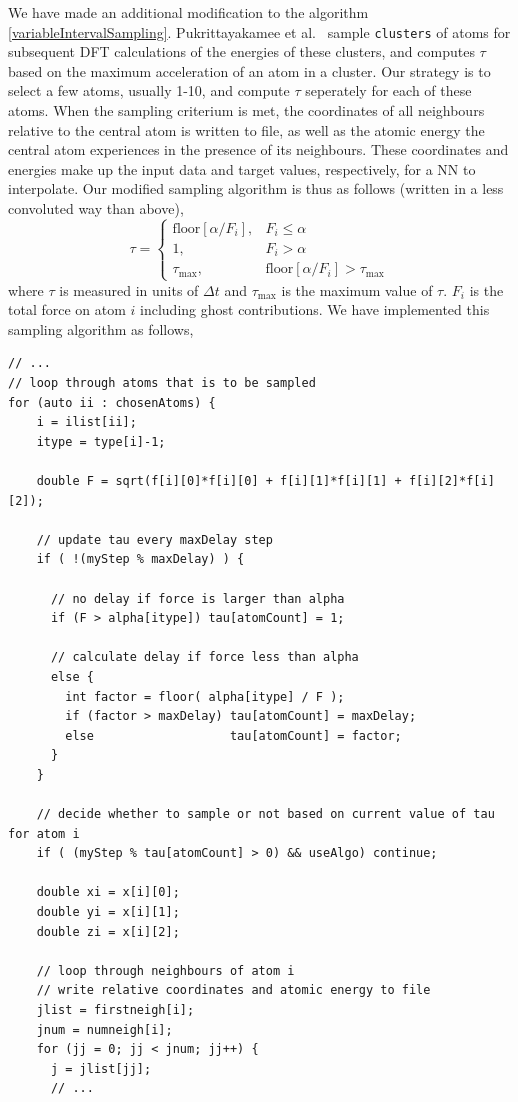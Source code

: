 \documentclass[twoside,english]{uiofysmaster}
\begin{document}
We have made an additional modification to the algorithm \eqref{variableIntervalSampling}.  
Pukrittayakamee et al.\ \cite{Pukrittayakamee09} sample \texttt{clusters} of atoms for subsequent DFT calculations
of the energies of these clusters, and computes $\tau$ based on the maximum acceleration of an atom in a cluster. 
Our strategy is to select a few atoms, usually 1-10, and compute $\tau$ seperately for each of these atoms. When 
the sampling criterium is met, the coordinates of all neighbours relative to the central atom is written to file, 
as well as the atomic energy the central atom experiences in the presence of its neighbours. These coordinates
and energies make up the input data and target values, respectively, for a NN to interpolate. 
Our modified sampling algorithm is thus as follows (written in a less convoluted way than above),
\begin{equation}
 \tau = 
\begin{cases}
  \textrm{floor}\left[\alpha/F_i\right], &F_i \leq \alpha \\
  1, &F_i > \alpha \\
  \tau_\textrm{max}, &\textrm{floor}\left[\alpha/F_i\right] > \tau_\textrm{max}
\end{cases}
\label{samplingAlgorithmModified}
\end{equation}
where $\tau$ is measured in units of $\Delta t$ and $\tau_\textrm{max}$ is the maximum value of $\tau$.
$F_i$ is the total force on atom $i$ including ghost contributions. 
We have implemented this sampling algorithm as follows,
\begin{listing}[H]
\begin{verbatim}
// ...
// loop through atoms that is to be sampled
for (auto ii : chosenAtoms) {
    i = ilist[ii];
    itype = type[i]-1;

    double F = sqrt(f[i][0]*f[i][0] + f[i][1]*f[i][1] + f[i][2]*f[i][2]);

    // update tau every maxDelay step
    if ( !(myStep % maxDelay) ) {

      // no delay if force is larger than alpha
      if (F > alpha[itype]) tau[atomCount] = 1;

      // calculate delay if force less than alpha
      else {
        int factor = floor( alpha[itype] / F );
        if (factor > maxDelay) tau[atomCount] = maxDelay;
        else                   tau[atomCount] = factor;
      }
    }

    // decide whether to sample or not based on current value of tau for atom i
    if ( (myStep % tau[atomCount] > 0) && useAlgo) continue;

    double xi = x[i][0];
    double yi = x[i][1];
    double zi = x[i][2];
    
    // loop through neighbours of atom i 
    // write relative coordinates and atomic energy to file
    jlist = firstneigh[i];
    jnum = numneigh[i];
    for (jj = 0; jj < jnum; jj++) {
      j = jlist[jj];
      // ...
\end{verbatim}
\end{listing}
\end{document}
